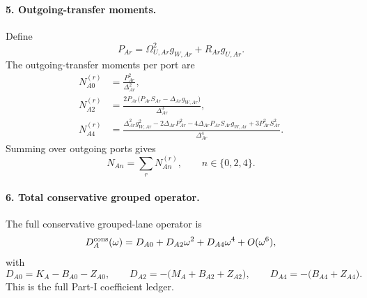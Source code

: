 \paragraph{5. Outgoing-transfer moments.}
Define
\begin{equation}
\label{eq:app-stage023-p-ar}
P_{A r}=\Omega_{U,A r}^2g_{W,A r}+R_{A r}g_{U,A r}.
\end{equation}
The outgoing-transfer moments per port are
\begin{align}
\label{eq:app-stage023-n-moments-port}
N_{A0}^{(r)}&=\frac{P_{A r}^2}{\Delta_{A r}^2},\\
N_{A2}^{(r)}&=\frac{2P_{A r}\bigl(P_{A r}S_{A r}-\Delta_{A r}g_{W,A r}\bigr)}{\Delta_{A r}^3},\\
N_{A4}^{(r)}&=\frac{\Delta_{A r}^2g_{W,A r}^2-2\Delta_{A r}P_{A r}^2-4\Delta_{A r}P_{A r}S_{A r}g_{W,A r}+3P_{A r}^2S_{A r}^2}{\Delta_{A r}^4}.
\end{align}
Summing over outgoing ports gives
\begin{equation}
\label{eq:app-stage023-n-sum}
N_{An}=\sum_rN_{An}^{(r)},
\qquad
n\in\{0,2,4\}.
\end{equation}

\paragraph{6. Total conservative grouped operator.}
The full conservative grouped-lane operator is
\begin{equation}
\label{eq:app-stage023-d-total}
D_A^{\rm cons}(\omega)=D_{A0}+D_{A2}\omega^2+D_{A4}\omega^4+O(\omega^6),
\end{equation}
with
\begin{equation}
\label{eq:app-stage023-d-coeffs}
\boxed{
D_{A0}=K_A-B_{A0}-Z_{A0},
\qquad
D_{A2}=-\bigl(M_A+B_{A2}+Z_{A2}\bigr),
\qquad
D_{A4}=-\bigl(B_{A4}+Z_{A4}\bigr)}.
\end{equation}
This is the full Part-I coefficient ledger.

